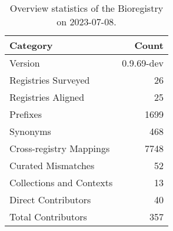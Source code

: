 \begin{table}
\caption{Overview statistics of the Bioregistry on 2023-07-08.}
\label{tab:bioregistry-summary}
\begin{tabular}{lr}
\toprule
Category & Count \\
\midrule
Version & 0.9.69-dev \\
Registries Surveyed & 26 \\
Registries Aligned & 25 \\
Prefixes & 1699 \\
Synonyms & 468 \\
Cross-registry Mappings & 7748 \\
Curated Mismatches & 52 \\
Collections and Contexts & 13 \\
Direct Contributors & 40 \\
Total Contributors & 357 \\
\bottomrule
\end{tabular}
\end{table}

